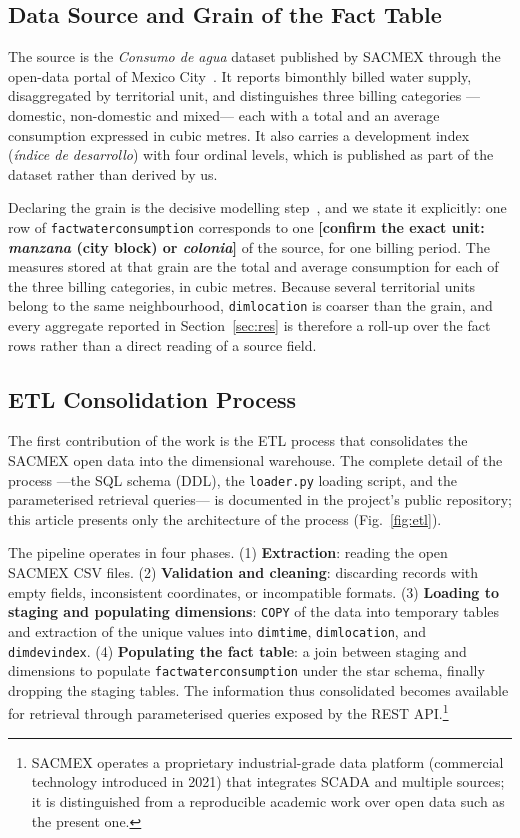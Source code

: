 \documentclass[runningheads]{llncs}
\renewcommand{\_}{\origunderscore\allowbreak}
\newif\ifshowchanges
\newenvironment{chgblock}{\ifshowchanges\color{chg}\fi}{}
\newcommand{\fillin}[1]{\textcolor{todo}{\textbf{[#1]}}}
\begin{document}
\begin{chgblock}
\subsection{Data Source and Grain of the Fact Table}
\label{sec:grain}

The source is the \emph{Consumo de agua} dataset published by SACMEX through the
open-data portal of Mexico City~\cite{sacmex}. It reports bimonthly billed water
supply, disaggregated by territorial unit, and distinguishes three billing
categories ---domestic, non-domestic and mixed--- each with a total and an
average consumption expressed in cubic metres. It also carries a development
index (\emph{\'indice de desarrollo}) with four ordinal levels, which is
published as part of the dataset rather than derived by us.

Declaring the grain is the decisive modelling step~\cite{kimball}, and we state
it explicitly: one row of \texttt{fact\_water\_consumption} corresponds to one
\fillin{confirm the exact unit: \emph{manzana} (city block) or \emph{colonia}}
of the source, for one billing period. The measures stored at that grain are the
total and average consumption for each of the three billing categories, in cubic
metres. Because several territorial units belong to the same neighbourhood,
\texttt{dim\_location} is coarser than the grain, and every aggregate reported in
Section~\ref{sec:res} is therefore a roll-up over the fact rows rather than a
direct reading of a source field.
\end{chgblock}

\subsection{ETL Consolidation Process}
\label{sec:etl}

The first contribution of the work is the ETL process that consolidates the
SACMEX open data into the dimensional warehouse. The complete detail of the
process ---the SQL schema (DDL), the \texttt{loader.py} loading script, and the
parameterised retrieval queries--- is documented in the project's public
repository; this article presents only the architecture of the process
(Fig.~\ref{fig:etl}).

The pipeline operates in four phases. (1) \textbf{Extraction}: reading the open
SACMEX CSV files. (2) \textbf{Validation and cleaning}: discarding records with
empty fields, inconsistent coordinates, or incompatible formats.
(3) \textbf{Loading to staging and populating dimensions}: \texttt{COPY} of the
data into temporary tables and extraction of the unique values into
\texttt{dim\_time}, \texttt{dim\_location}, and \texttt{dim\_dev\_index}.
(4) \textbf{Populating the fact table}: a join between staging and dimensions to
populate \texttt{fact\_water\_consumption} under the star schema, finally
dropping the staging tables. The information thus consolidated becomes available
for retrieval through parameterised queries exposed by the REST
API.\footnote{SACMEX operates a proprietary industrial-grade data platform
(commercial technology introduced in 2021) that integrates SCADA and multiple
sources; it is distinguished from a reproducible academic work over open data
such as the present one.}
\end{document}
